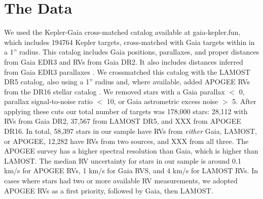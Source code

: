 \section{The Data}
\label{sec:data}

We used the Kepler-Gaia cross-matched catalog available at gaia-kepler.fun,
which includes 194764 Kepler targets, cross-matched with Gaia targets within
in a 1'' radius.
This catalog includes Gaia positions, parallaxes, and proper distances from
Gaia EDR3 and RVs from Gaia DR2.
It also includes distances inferred from Gaia EDR3 parallaxes
\citep{bailer-jones2020}.
We crossmatched this catalog with the LAMOST DR5 catalog, also using a 1''
radius and, where available, added APOGEE RVs from the DR16 stellar catalog
\citep{citations}.
We removed stars with a Gaia parallax $<$ 0, parallax signal-to-noise ratio
$<$ 10, or Gaia astrometric excess noise $>$ 5.
After applying these cuts our total number of targets was 178,000 stars:
28,112 with RVs from Gaia DR2, 37,567 from LAMOST DR5, and XXX from APOGEE
DR16.
In total, 58,397 stars in our sample have RVs from {\it either} Gaia,
LAMOST, or APOGEE, 12,282 have RVs from two sources, and XXX from all three.
The APOGEE survey has a higher spectral resolution than Gaia, which is higher
than LAMOST.
The median RV uncertainty for stars in our sample is around 0.1 km/s for
APOGEE RVs, 1 km/s for Gaia RVS, and 4 km/s for LAMOST RVs.
In cases where stars had two or more available RV measurements, we adopted
APOGEE RVs as a first priority, followed by Gaia, then LAMOST.

